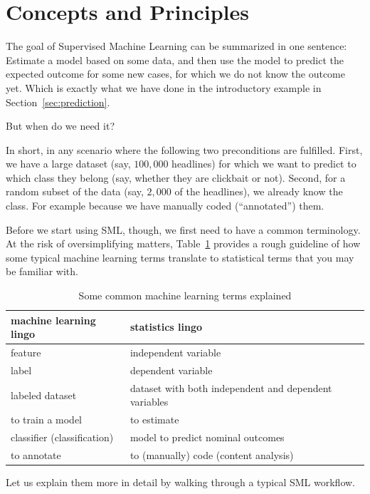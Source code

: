 \section{Concepts and Principles}
\label{sec:principles}

The goal of Supervised Machine Learning can be summarized in one sentence:
Estimate a model based on some data, and then use the model to predict the
expected outcome for some new cases, for which we do not know the outcome yet.
Which is exactly what we have done in the introductory example in Section~\ref{sec:prediction}.

But when do we need it?

In short, in any scenario where the following two preconditions are fulfilled.
First, we have a large dataset (say, $100,000$
headlines) for which we want to predict to which class they belong (say, whether
they are clickbait or not).
Second, for a random subset of the data (say, $2,000$ of the headlines), we already
know the class.
For example because we have manually coded (``annotated'') them.

Before we start using SML, though, we first need to have
a common terminology.
At the risk of oversimplifying matters, Table~\ref{tab:mllingo} provides a rough
guideline of how some typical machine learning terms translate to statistical
terms that you may be familiar with.

\begin{table}
  \centering
\begin{tabularx}{\textwidth}{XX}
\toprule
machine learning lingo  & statistics lingo\\ \midrule
feature                 & independent variable  \\
label                   & dependent variable  \\
labeled dataset         & dataset with both independent and dependent variables\\
to train a model        & to estimate \\
classifier (classification)  & model to predict nominal outcomes \\
to annotate             & to (manually) code (content analysis) \\
\bottomrule
\end{tabularx}
\caption{Some common machine learning terms explained\label{tab:mllingo}}
\end{table}

Let us explain them more in detail by walking through a typical SML workflow.

